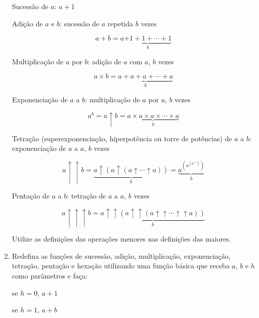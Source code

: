 \begin{enumerate}
	Sucessão de $a$: 
	$a + 1$
	
	Adição de $a$ e $b$: 
	sucessão de $a$ repetida $b$ vezes 
	
	\begin{equation*}
		a + b = a\underbrace{ + 1 + 1 + \cdots + 1}_b
	\end{equation*}
	
	
	Multiplicação de $a$ por $b$: 
	adição de $a$ com $a$, $b$ vezes  	
	
	\begin{equation*}
		a \times b = \underbrace{a + a + a + \cdots + a}_b
	\end{equation*}
	
	Exponenciação de $a$ a $b$: 
	multiplicação de $a$ por $a$, $b$ vezes  
	
	\begin{equation*}
		a^b = a\uparrow b = \underbrace{a \times a \times a \times \cdots \times a}_b
	\end{equation*}
	
	Tetração (superexponenciação, hiperpotência ou torre de potências) de $a$ a $b$: 
	exponenciação de $a$ a $a$, $b$ vezes
	
	\begin{equation*}
		a\uparrow \uparrow b 
		= \underbrace{a \uparrow (a \uparrow (a \uparrow \cdots \uparrow a))}_b 
		= \underbrace{a^{\left(a^{\left(a^{\iddots^a}\right)}\right)}}_b	
	\end{equation*}
	
	Pentação de $a$ a $b$:
	tetração de $a$ a $a$, $b$ vezes
	
	\begin{equation*}
		a\uparrow \uparrow \uparrow b 
		= \underbrace{a \uparrow\uparrow (a \uparrow\uparrow (a \uparrow\uparrow \cdots \uparrow\uparrow a))}_b 			 	
	\end{equation*}
	
	Utilize as definições das operações menores nas definições das maiores.
	
\quebra		
	
	\item Redefina as funções de sucessão, adição, multiplicação, exponenciação, tetração, pentação e hexação utilizando uma função básica que receba $a$, $b$ e $h$ como parâmetros e faça:
	
	\begin{multicols}{2}			
		
		se $h=0$, 
		$a + 1$
		
		se $h=1$, 
		$a + b$ 
		

\end{multicols}
\end{enumerate}
